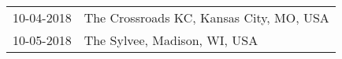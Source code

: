 \begin{supertabular}{ll}
 10-04-2018 &  The Crossroads KC, Kansas City, MO, USA \\
 10-05-2018 &             The Sylvee, Madison, WI, USA \\
\end{supertabular}
